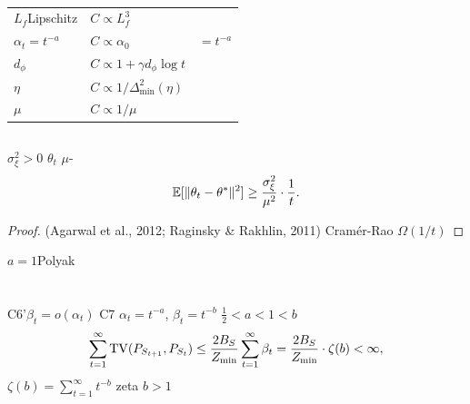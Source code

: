 \begin{table}[ht]
\centering
\caption{}
\label{tab:params}
\begin{tabular}{@{}lll@{}}
\toprule
 &  &  \\
\midrule
$L_f$Lipschitz & $C \propto L_f^3$ &  \\
$\alpha_t = t^{-a}$ & $C \propto \alpha_0$ &  $= t^{-a}$ \\
$d_\phi$ & $C \propto 1 + \gamma d_\phi \log t$ &  \\
$\eta$ & $C \propto 1/\Delta_{\min}^2(\eta)$ &  \\
$\mu$ & $C \propto 1/\mu$ &  \\
\bottomrule
\end{tabular}
\end{table}

\subsection{}

\begin{theorem}[]\label{thm:minimax-lower}
 $\sigma_\xi^2 > 0$  $\theta_t$  $\mu$-
\begin{equation}
    \mathbb{E}[\|\theta_t - \theta^*\|^2] \geq \frac{\sigma_\xi^2}{\mu^2} \cdot \frac{1}{t}.
\end{equation}
\end{theorem}

\begin{proof}
 (Agarwal et al., 2012; Raginsky \& Rakhlin, 2011) Cram\'{e}r-Rao  $\Omega(1/t)$
\end{proof}

$a = 1$Polyak 

\section{}\label{sec:annealing}

\begin{theorem}[]\label{thm:annealing}
 C6'$\beta_t = o(\alpha_t)$ C7 $\alpha_t = t^{-a}$, $\beta_t = t^{-b}$  $\frac{1}{2} < a < 1 < b$
\begin{equation}
    \sum_{t=1}^\infty \operatorname{TV}(P_{S_{t+1}}, P_{S_t}) \leq \frac{2 B_S}{Z_{\min}} \sum_{t=1}^\infty \beta_t = \frac{2 B_S}{Z_{\min}} \cdot \zeta(b) < \infty,
\end{equation}
 $\zeta(b) = \sum_{t=1}^\infty t^{-b}$  zeta  $b > 1$ 
\end{theorem}


